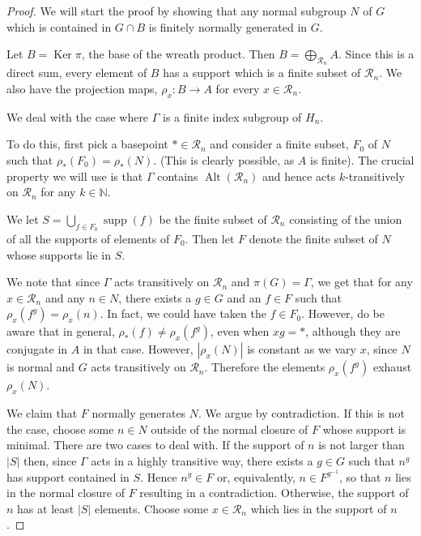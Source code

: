 \documentclass[11pt,a4paper]{amsart}
\theoremstyle{definition}
\theoremstyle{remark}
\newcommand{\supp}{\operatorname{supp}}
\newcommand{\Alt}{\operatorname{Alt}}
\newcommand{\N}{\mathbb N}
\newcommand{\Ra}{\mathcal{R}}
\renewcommand{\ker}{\operatorname{Ker}}
\begin{document}
\begin{proof} 
	
We will start the proof by showing that any normal subgroup $N$ of $G$ which is contained in $G \cap B $ is finitely normally generated in $G$. 

	
	Let $B=\ker \pi$, the base of the wreath product. Then $B = \bigoplus_{\Ra_n} A$. Since this is a direct sum, every element of $B$ has a support which is a finite subset of $\Ra_n$. We also have the projection maps, $\rho_x: B \to A$ for every $x \in \Ra_n$.


	We deal with the case where $\Gamma$ is a finite index subgroup of $H_n$. 


To do this, first pick a basepoint $* \in \Ra_n$ and consider a finite subset, $F_0$ of $N$ such that $\rho_*(F_0) = \rho_*(N)$. (This is clearly possible, as $A$ is finite). 
The crucial property we will use is that $\Gamma$ contains $\Alt(\Ra_n)$ and hence acts $k$-transitively on $\Ra_n$ for any $k \in \N$. 


We let $S = \bigcup_{f \in F_0} \supp(f)$ be the finite subset of $\Ra_n$ consisting of the union of all the supports of elements of $F_0$. Then let $F$ denote the finite subset of $N$ whose supports lie in $S$. 

We note that since $\Gamma$ acts transitively on $\Ra_n$ and $\pi(G) = \Gamma$, we get that for any $x \in \Ra_n$ and any $n \in N$, there exists a $g \in G$ and an $ f \in F$ such that $\rho_x(f^g) = \rho_x(n)$. In fact, we could have taken the $f \in F_0$. However, do be aware that in general, $\rho_*(f) \neq \rho_x(f^g)$, even when $xg=*$, although they are conjugate in $A$ in that case. However, $|\rho_x(N)|$ is constant as we vary $x$, since $N$ is normal and $G$ acts transitively on $\Ra_n$. Therefore the elements $\rho_x(f^g)$ exhaust $\rho_x(N)$.  

We claim that $F$ normally generates $N$. We argue by contradiction. If this is not the case, choose some $n \in N$ outside of the normal closure of $F$ whose support is minimal. There are two cases to deal with. If the support of $n$ is not larger than $|S|$ then, since $\Gamma$ acts in a highly transitive way, there exists a $g \in G$ such that $n^g$ has support contained in $S$. Hence $n^g \in F$ or, equivalently, $n \in F^{g^{-1}}$, so that $n$ lies in the normal closure of $F$ resulting in a contradiction. Otherwise, the support of $n$ has at least $|S|$ elements. Choose some $x \in \Ra_n$ which lies in the support of $n$. 



\end{proof}
\end{document}
